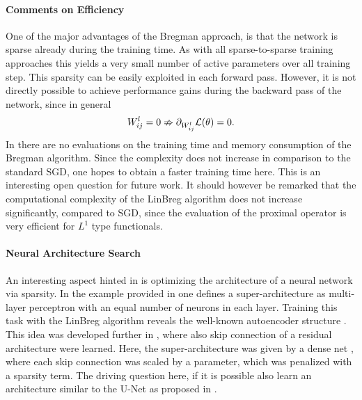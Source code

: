 \paragraph{Comments on Efficiency} One of the major advantages of the Bregman approach, is that the network is sparse already during the training time. As with all sparse-to-sparse training approaches this yields a very small number of active parameters over all training step. This sparsity can be easily exploited in each forward pass. However, it is not directly possible to achieve performance gains during the backward pass of the network, since in general
%
\begin{align*}
	W^l_{ij} = 0 \nRightarrow \partial_{W^l_{ij}} \mathcal{L}(\theta) = 0.
\end{align*}
%
In \cite{bungert2022bregman, bungert2021neural} there are no evaluations on the training time and memory consumption of the Bregman algorithm. Since the complexity does not increase in comparison to the standard SGD, one hopes to obtain a faster training time here. This is an interesting open question for future work. It should however be remarked that the computational complexity of the LinBreg algorithm does not increase significantly, compared to SGD, since the evaluation of the proximal operator is very efficient for $L^1$ type functionals.

\paragraph{Neural Architecture Search} An interesting aspect hinted in \cite{bungert2022bregman} is optimizing the architecture of a neural network via sparsity. In the example provided in \cite[Fig. 4]{bungert2022bregman} one defines a super-architecture as multi-layer perceptron with an equal number of neurons in each layer. Training this task with the LinBreg algorithm reveals the well-known autoencoder structure \cite{hinton1993autoencoders}. This idea was developed further in \cite{bungert2021neural}, where also skip connection of a residual architecture were learned. Here, the super-architecture was given by a dense net \cite{huang2017densely}, where each skip connection was scaled by a parameter, which was penalized with a sparsity term. The driving question here, if it is possible also learn an architecture similar to the U-Net as proposed in \cite{ronneberger2015u}.
%
%